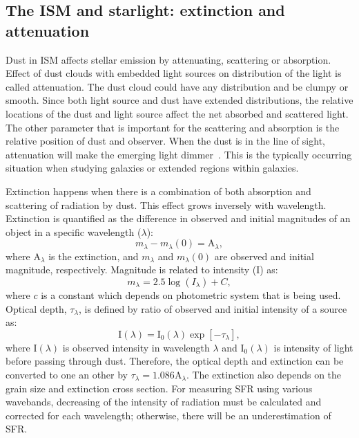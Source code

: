 \subsection{The ISM and starlight: extinction and attenuation}
\label{sec: extinction}
Dust in ISM affects stellar emission by attenuating, scattering or absorption.
Effect of dust clouds with embedded light sources on distribution of the light is called attenuation. 
The dust cloud could have any distribution and be clumpy or smooth. 
Since both light source and dust have extended distributions, the relative locations of the dust and light source affect the net absorbed and scattered light.
The other parameter that is important for the scattering and absorption is the relative position of dust and observer.
When the dust is in the line of sight, attenuation will make the emerging light dimmer~\citep[e.g.][and references therein]{Calzetti13}.
This is the typically occurring situation when studying galaxies or extended regions within galaxies.

Extinction happens when there is a combination of both absorption and scattering of radiation by dust.
This effect grows inversely with wavelength.
Extinction is quantified as the difference in observed and initial magnitudes of an object in a specific wavelength ($\lambda$):
\begin{equation}
m_{\lambda} - m_{\lambda}(0) = \mathrm{A}_{\lambda},
\end{equation}
where $\mathrm{A}_{\lambda}$ is the extinction, and $m_{\lambda}$ and $m_{\lambda}(0)$ are observed and initial magnitude, respectively.
Magnitude is related to intensity (I) as:
\begin{equation}
m_{\lambda} = 2.5 \log (I_{\lambda}) + C,
\end{equation}
where $c$ is a constant which depends on photometric system that is being used.
Optical depth, $\tau_{\lambda}$, is defined by ratio of observed and initial intensity of a source as:
\begin{equation}
\label{equ: extinction}
{\mathrm I}(\lambda) = {\mathrm I}_0(\lambda)\exp[-\tau_{\lambda}],
\end{equation}
where I$(\lambda)$ is observed intensity in wavelength $\lambda$ and I$_0(\lambda)$ is intensity of light before passing through dust.
Therefore, the optical depth and extinction can be converted to one an other by $\tau_{\lambda} = 1.086 \mathrm{A}_{\lambda}$. 
The extinction also depends on the grain size and extinction cross section.
For measuring SFR using various wavebands, decreasing of the intensity of radiation must be calculated and corrected for each wavelength; otherwise, there will be an underestimation of SFR. 

